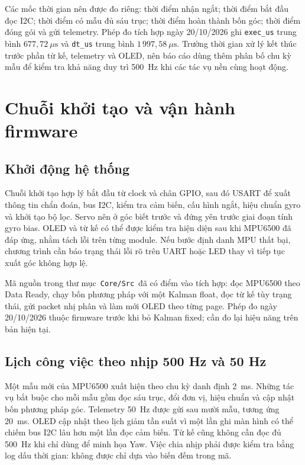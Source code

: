 Các mốc thời gian nên được đo riêng: thời điểm nhận ngắt; thời điểm bắt đầu đọc I2C; thời điểm có mẫu đủ sáu trục; thời điểm hoàn thành bốn góc; thời điểm đóng gói và gửi telemetry. Phép đo tích hợp ngày 20/10/2026 ghi \texttt{exec\_us} trung bình $677{,}72~\mu\mathrm{s}$ và \texttt{dt\_us} trung bình $1\,997{,}58~\mu\mathrm{s}$. Trường thời gian xử lý kết thúc trước phần từ kế, telemetry và OLED, nên báo cáo dùng thêm phân bố chu kỳ mẫu để kiểm tra khả năng duy trì 500~Hz khi các tác vụ nền cùng hoạt động.

\section{Chuỗi khởi tạo và vận hành firmware}
\subsection{Khởi động hệ thống}
Chuỗi khởi tạo hợp lý bắt đầu từ clock và chân GPIO, sau đó USART để xuất thông tin chẩn đoán, bus I2C, kiểm tra cảm biến, cấu hình ngắt, hiệu chuẩn gyro và khởi tạo bộ lọc. Servo nên ở góc biết trước và đứng yên trước giai đoạn tính gyro bias. OLED và từ kế có thể được kiểm tra hiện diện sau khi MPU6500 đã đáp ứng, nhằm tách lỗi trên từng module. Nếu bước định danh MPU thất bại, chương trình cần báo trạng thái lỗi rõ trên UART hoặc LED thay vì tiếp tục xuất góc không hợp lệ.

Mã nguồn trong thư mục \,\texttt{Core/Src}\, đã có điểm vào tích hợp: đọc MPU6500 theo Data Ready, chạy bốn phương pháp với một Kalman float, đọc từ kế tùy trạng thái, gửi packet nhị phân và làm mới OLED theo từng page. Phép đo ngày 20/10/2026 thuộc firmware trước khi bỏ Kalman fixed; cần đo lại hiệu năng trên bản hiện tại.

\subsection{Lịch công việc theo nhịp 500 Hz và 50 Hz}
Một mẫu mới của MPU6500 xuất hiện theo chu kỳ danh định 2~ms. Những tác vụ bắt buộc cho mỗi mẫu gồm đọc sáu trục, đổi đơn vị, hiệu chuẩn và cập nhật bốn phương pháp góc. Telemetry 50~Hz được gửi sau mười mẫu, tương ứng 20~ms. OLED cập nhật theo lịch giảm tần suất vì một lần ghi màn hình có thể chiếm bus I2C lâu hơn một lần đọc cảm biến. Từ kế cũng không cần đọc đủ 500~Hz khi chỉ dùng để minh họa Yaw. Việc chia nhịp phải được kiểm tra bằng log dấu thời gian: không được chỉ dựa vào biến đếm trong mã.

